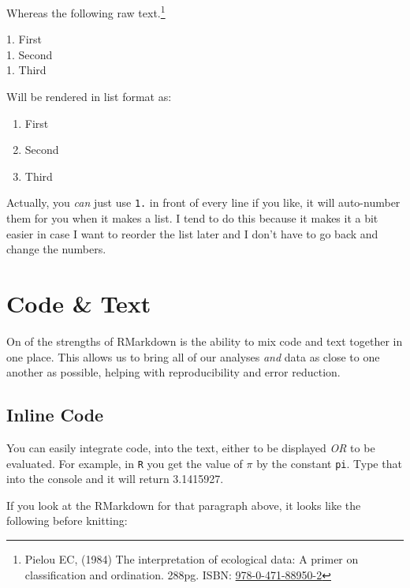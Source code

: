 \documentclass[
  letterpaper,
]{book}
\newenvironment{Shaded}{\begin{snugshade}}{\end{snugshade}}
\newcommand{\AttributeTok}[1]{\textcolor[rgb]{0.40,0.45,0.13}{#1}}
\newcommand{\ControlFlowTok}[1]{\textcolor[rgb]{0.00,0.23,0.31}{\textbf{#1}}}
\newcommand{\DecValTok}[1]{\textcolor[rgb]{0.68,0.00,0.00}{#1}}
\newcommand{\FloatTok}[1]{\textcolor[rgb]{0.68,0.00,0.00}{#1}}
\newcommand{\NormalTok}[1]{\textcolor[rgb]{0.00,0.23,0.31}{#1}}
\newcommand{\SpecialCharTok}[1]{\textcolor[rgb]{0.37,0.37,0.37}{#1}}
\newcommand{\StringTok}[1]{\textcolor[rgb]{0.13,0.47,0.30}{#1}}
\providecommand{\tightlist}{%
  \setlength{\itemsep}{0pt}\setlength{\parskip}{0pt}}
\begin{document}
Whereas the following raw text.\footnote{Pielou EC, (1984) The
  interpretation of ecological data: A primer on classification and
  ordination. 288pg. ISBN:
  \href{https://www.wiley.com/en-us/The+Interpretation+of+Ecological+Data\%3A+A+Primer+on+Classification+and+Ordination-p-9780471889502}{978-0-471-88950-2}}

1. First\\
1. Second\\
1. Third

Will be rendered in list format as:

\begin{enumerate}
\def\labelenumi{\arabic{enumi}.}
\tightlist
\item
  First\\
\item
  Second\\
\item
  Third
\end{enumerate}

Actually, you \emph{can} just use \texttt{1.} in front of every line if
you like, it will auto-number them for you when it makes a list. I tend
to do this because it makes it a bit easier in case I want to reorder
the list later and I don't have to go back and change the numbers.

\section{Code \& Text}\label{code-text}

On of the strengths of RMarkdown is the ability to mix code and text
together in one place. This allows us to bring all of our analyses
\emph{and} data as close to one another as possible, helping with
reproducibility and error reduction.

\subsection{Inline Code}\label{inline-code}

You can easily integrate code, into the text, either to be displayed
\emph{OR} to be evaluated. For example, in \texttt{R} you get the value
of \(\pi\) by the constant \texttt{pi}. Type that into the console and
it will return 3.1415927.

If you look at the RMarkdown for that paragraph above, it looks like the
following before knitting:

\begin{Shaded}
\end{Shaded}
\end{document}
